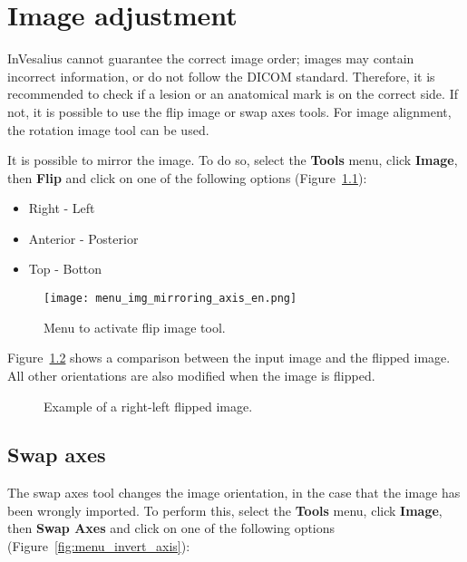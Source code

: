 \chapter{Image adjustment}

InVesalius cannot guarantee the correct image order; images may contain incorrect information, or do not follow the DICOM standard. Therefore, it is recommended to check if a lesion or an anatomical mark is on the correct side. If not, it is possible to use the flip image or swap axes tools. For image alignment, the rotation image tool can be used.

It is possible to mirror the image. To do so, select the \textbf{Tools} menu, click \textbf{Image}, then \textbf{Flip} and click on one of the following options (Figure~\ref{fig:menu_img_mirroring_axis_pt}):

\begin{itemize}
	\item Right - Left
	\item Anterior - Posterior
	\item Top - Botton
\end{itemize}

\begin{figure}[!htb]
\centering
\texttt{[image: menu\_img\_mirroring\_axis\_en.png]}
\caption{Menu to activate flip image tool.}
\label{fig:menu_img_mirroring_axis_pt}
\end{figure}


Figure~\ref{fig:mirrored} shows a comparison between the input image and the flipped image. All other orientations are also modified when the image is flipped.

\begin{figure}[!htb]
  \centering
    \qquad
  \hfill
  \caption{Example of a right-left flipped image.}
  \label{fig:mirrored}
\end{figure}

\section{Swap axes}

The swap axes tool changes the image orientation, in the case that the image has been wrongly imported. To perform this, select the \textbf{Tools} menu, click \textbf{Image}, then \textbf{Swap Axes} and click on one of the following options (Figure~\ref{fig:menu_invert_axis}):

